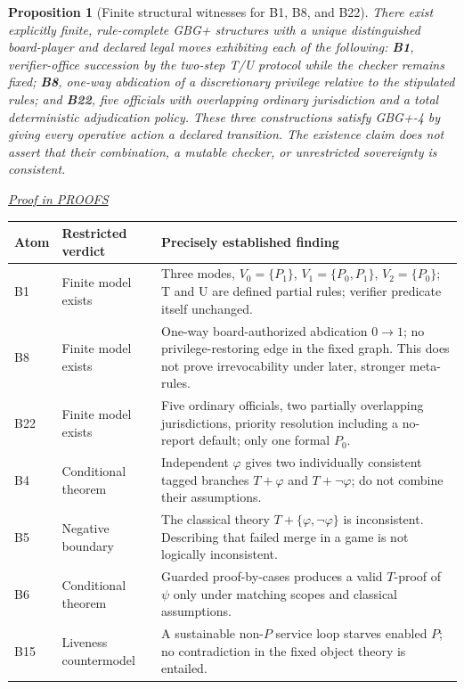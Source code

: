 \documentclass[11pt,letterpaper]{article}
\newtheorem{proposition}[theorem]{Proposition}
\theoremstyle{definition}\newtheorem{definition}[theorem]{Definition}\newtheorem{example}[theorem]{Example}
\theoremstyle{remark}\newtheorem{remark}[theorem]{Remark}
\newcommand{\proofat}[1]{\par\smallskip\noindent\hfill\textit{\hyperref[#1]{Proof in PROOFS}}}
\begin{document}
\begin{proposition}[Finite structural witnesses for B1, B8, and B22]\label{w0:prop:atom-witnesses}
There exist explicitly finite, rule-complete GBG+ structures with a unique distinguished board-player and declared legal moves exhibiting each of the following: \textbf{B1}, verifier-office succession by the two-step T/U protocol while the checker remains fixed; \textbf{B8}, one-way abdication of a discretionary privilege relative to the stipulated rules; and \textbf{B22}, five officials with overlapping ordinary jurisdiction and a total deterministic adjudication policy. These three constructions satisfy GBG+-4 by giving every operative action a declared transition. The existence claim does not assert that their combination, a mutable checker, or unrestricted sovereignty is consistent.\proofat{w0:pr:atom-witnesses}
\end{proposition}

\begin{center}
\small
\begin{tabularx}{\textwidth}{@{}p{}p{}X@{}}
\toprule
\textbf{Atom}&\textbf{Restricted verdict}&\textbf{Precisely established finding}\\\midrule
B1&Finite model exists&Three modes, $V_0=\{P_1\}$, $V_1=\{P_0,P_1\}$, $V_2=\{P_0\}$; T and U are defined partial rules; verifier predicate itself unchanged.\\
B8&Finite model exists&One-way board-authorized abdication $0\to1$; no privilege-restoring edge in the fixed graph. This does not prove irrevocability under later, stronger meta-rules.\\
B22&Finite model exists&Five ordinary officials, two partially overlapping jurisdictions, priority resolution including a no-report default; only one formal $P_0$.\\
B4&Conditional theorem&Independent $\varphi$ gives two individually consistent tagged branches $T+\varphi$ and $T+\neg\varphi$; do not combine their assumptions.\\
B5&Negative boundary&The classical theory $T+\{\varphi,\neg\varphi\}$ is inconsistent. Describing that failed merge in a game is not logically inconsistent.\\
B6&Conditional theorem&Guarded proof-by-cases produces a valid $T$-proof of $\psi$ only under matching scopes and classical assumptions.\\
B15&Liveness countermodel&A sustainable non-$P$ service loop starves enabled $P$; no contradiction in the fixed object theory is entailed.\\
\bottomrule
\end{tabularx}
\end{center}
\end{document}
